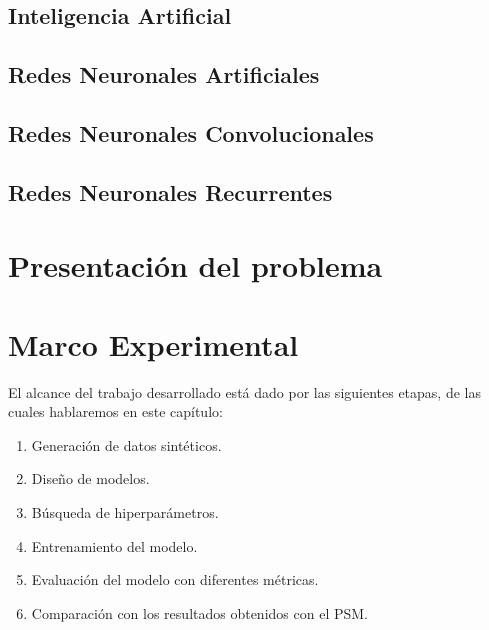 \documentclass[a4paper,12pt,spanish]{book}
\begin{document}
\section{Inteligencia Artificial}


\section{Redes Neuronales Artificiales}


\section{Redes Neuronales Convolucionales}


\section{Redes Neuronales Recurrentes}


% 

\chapter{Presentación del problema} \label{sec:problema}


\chapter{Marco Experimental}
El alcance del trabajo desarrollado está dado por las siguientes etapas, de las
cuales hablaremos en este capítulo:
\begin{enumerate}[itemsep=0.1cm, label=\textbf{\arabic*.}]
    \item Generación de datos sintéticos.
    \item Diseño de modelos.
    \item Búsqueda de hiperparámetros.
    \item Entrenamiento del modelo.
    \item Evaluación del modelo con diferentes métricas.
    \item Comparación con los resultados obtenidos con el PSM.
\end{enumerate}
\end{document}

